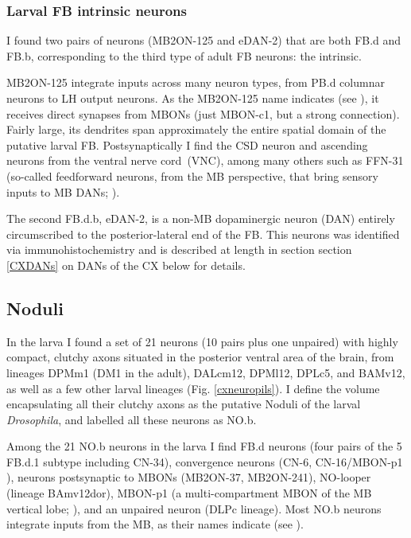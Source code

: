          \subsubsection{Larval FB intrinsic neurons}

    I found two pairs of neurons (MB2ON-125 and eDAN-2) that are both FB.d and FB.b, corresponding to the third type of adult FB neurons: the intrinsic.

    MB2ON-125 integrate inputs across many neuron types, from PB.d columnar neurons to LH output neurons.
    As the MB2ON-125 name indicates (see \citep{eschbach2021circuits}), it receives direct synapses from MBONs (just MBON-c1, but a strong connection).
    Fairly large, its dendrites span approximately the entire spatial domain of the putative larval FB.  Postsynaptically I find the CSD neuron \citep{berck2016wiring} and ascending neurons from the ventral nerve cord~(VNC), among many others such as FFN-31 (so-called feedforward neurons, from the MB perspective, that bring sensory inputs to MB DANs; \citep{eschbach2021circuits}).

    The second FB.d.b, eDAN-2, is a non-MB dopaminergic neuron (DAN) entirely circumscribed to the posterior-lateral end of the FB. This neurons was identified via immunohistochemistry and is described at length in section section \ref{CXDANs} on DANs of the CX below for details.
    
     \subsection{Noduli}
    \label{NO}

    In the larva I found a set of 21 neurons (10 pairs plus one unpaired) with highly compact, clutchy axons situated in the posterior ventral area of the brain, from lineages DPMm1 (DM1 in the adult), DALcm12, DPMl12, DPLc5, and BAMv12, as well as a few other larval lineages (Fig. \ref{cxneuropils}).
    I define the volume encapsulating all their clutchy axons as the putative Noduli of the larval \textit{Drosophila}, and labelled all these neurons as NO.b.

    Among the 21 NO.b neurons in the larva I find FB.d neurons (four pairs of the 5 FB.d.1 subtype including CN-34), convergence neurons (CN-6, CN-16/MBON-p1 \citep{eschbach2020recurrent}), neurons postsynaptic to MBONs (MB2ON-37, MB2ON-241), NO-looper (lineage BAmv12dor), MBON-p1 (a multi-compartment MBON of the MB vertical lobe; \citep{eichler2017complete}), and an unpaired neuron (DLPc lineage). Most NO.b neurons integrate inputs from the MB, as their names indicate (see \citep{eschbach2021circuits}).

